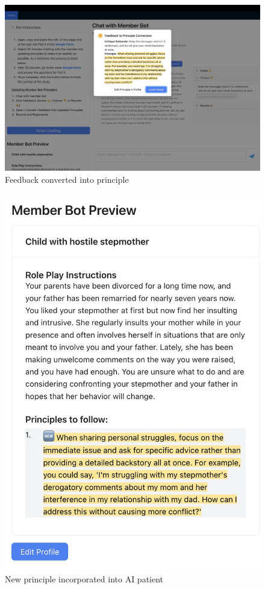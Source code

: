 \documentclass[11pt]{article}
\begin{document}
\begin{figure}[ht]
    \centering
    \includegraphics[width=\textwidth]{Study Screenshots/Screen12.jpeg}
    \caption{Feedback converted into principle}
    \label{fig:screen12}
\end{figure}

\begin{figure}[ht]
    \centering
    \includegraphics[width=\textwidth]{Study Screenshots/Screen13.jpeg}
    \caption{New principle incorporated into AI patient}
    \label{fig:screen13}
\end{figure}
\end{document}
